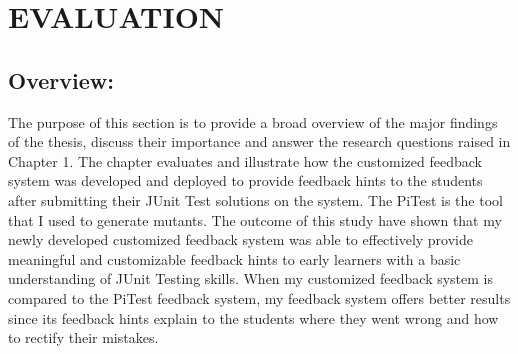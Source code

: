 \chapter{EVALUATION}
\label{chapter:EVALUATION}
\section{Overview:}
The purpose of this section is to provide a broad overview of the major findings of the thesis, discuss their importance and answer the research questions raised in Chapter 1. The chapter evaluates and illustrate how the customized feedback system was developed and deployed to provide feedback hints to the students after submitting their JUnit Test solutions on the system. The PiTest is the tool that I used to generate mutants. The outcome of this study have shown that my newly developed customized feedback system was able to effectively provide meaningful and customizable feedback hints to early learners with a basic understanding of JUnit Testing skills. When my customized feedback system is compared to the PiTest feedback system, my feedback system offers better results since its feedback hints explain to the students where they went wrong and how to rectify their mistakes. 

